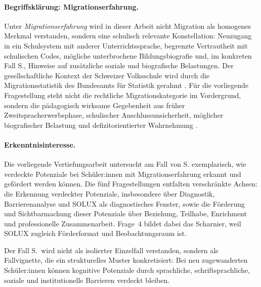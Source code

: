 \documentclass[ngerman, a4paper]{article}
\begin{document}
\paragraph{Begriffsklärung: Migrationserfahrung.}
Unter \textit{Migrationserfahrung} wird in dieser Arbeit nicht Migration als
homogenes Merkmal verstanden, sondern eine schulisch relevante Konstellation:
Neuzugang in ein Schulsystem mit anderer Unterrichtssprache, begrenzte
Vertrautheit mit schulischen Codes, mögliche unterbrochene Bildungsbiografie
und, im konkreten Fall S., Hinweise auf zusätzliche soziale und biografische
Belastungen. Der gesellschaftliche Kontext der Schweizer Volksschule wird
durch die Migrationsstatistik des Bundesamts für Statistik gerahmt
\parencite{bfs2022migration}. Für die vorliegende Fragestellung steht nicht
die rechtliche Migrationskategorie im Vordergrund, sondern die pädagogisch
wirksame Gegebenheit aus früher Zweitspracherwerbsphase, schulischer
Anschlussunsicherheit, möglicher biografischer Belastung und
defizitorientierter Wahrnehmung
\parencite{behrensen2019inklusive,stamm2021fehlenderblick}.


\paragraph{Erkenntnisinteresse.}
Die vorliegende Vertiefungsarbeit untersucht am Fall von S. exemplarisch, wie verdeckte
Potenziale bei Schüler:innen mit Migrationserfahrung erkannt und
gefördert werden können.
Die fünf Fragestellungen entfalten verschränkte Achsen:
die Erkennung verdeckter Potenziale, insbesondere über Diagnostik,
Barrierenanalyse und SOLUX als diagnostisches Fenster, sowie die Förderung und
Sichtbarmachung dieser Potenziale über Beziehung, Teilhabe, Enrichment und
professionelle Zusammenarbeit. Frage~4 bildet dabei das Scharnier, weil SOLUX
zugleich Förderformat und Beobachtungsraum ist.

Der Fall S.\ wird nicht als isolierter Einzelfall verstanden, sondern als
Fallvignette, die ein strukturelles Muster konkretisiert: Bei neu zugewanderten
Schüler:innen können kognitive Potenziale durch sprachliche, schriftsprachliche,
soziale und institutionelle Barrieren verdeckt bleiben.
\end{document}
